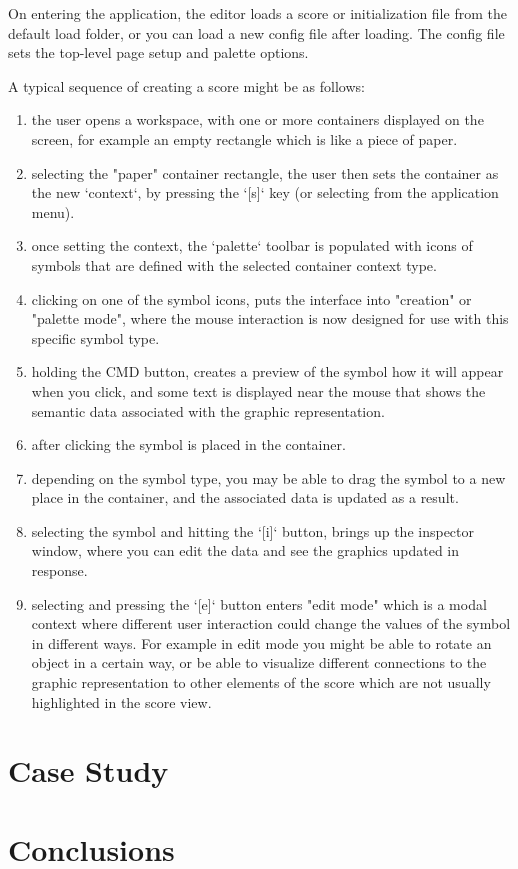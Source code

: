 \documentclass{article}
\begin{document}
On entering the application, the editor loads a score or initialization file from the default load folder, or you can load a new config file after loading. The config file sets the top-level page setup and palette options.

A typical sequence of creating a score might be as follows:
\begin{enumerate}\itemsep0pt
\item the user opens a workspace, with one or more containers displayed on the screen, for example an empty rectangle which is like a piece of paper.
\item selecting the "paper" container rectangle, the user then sets the container as the new `context`, by pressing the `[s]` key (or selecting from the application menu).
\item once setting the context, the `palette` toolbar is populated with icons of symbols that are defined with the selected container context type.
\item clicking on one of the symbol icons, puts the interface into "creation" or "palette mode", where the mouse interaction is now designed for use with this specific symbol type.
\item holding the CMD button, creates a preview of the symbol how it will appear when you click, and some text is displayed near the mouse that shows the semantic data associated with the graphic representation.
\item after clicking the symbol is placed in the container.
\item depending on the symbol type, you may be able to drag the symbol to a new place in the container, and the associated data is updated as a result.
\item selecting the symbol and hitting the `[i]` button, brings up the inspector window, where you can edit the data and see the graphics updated in response.
\item selecting and pressing the `[e]` button enters "edit mode" which is a modal context where different user interaction could change the values of the symbol in different ways. For example in edit mode you might be able to rotate an object in a certain way, or be able to visualize different connections to the graphic representation to other elements of the score which are not usually highlighted in the score view.
\end{enumerate}





\section{Case Study}\label{sec:james_score}



\section{Conclusions}


\begin{acknowledgments}

\end{acknowledgments} 

\balance %

\end{document}
